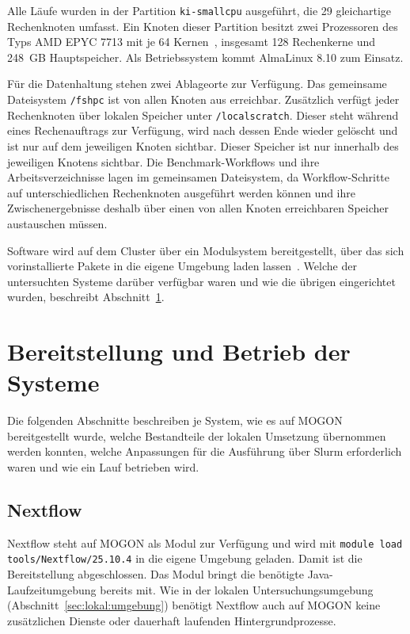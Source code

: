 Alle Läufe wurden in der Partition \texttt{ki-smallcpu} ausgeführt,
die 29 gleichartige Rechenknoten umfasst. Ein Knoten dieser
Partition besitzt zwei Prozessoren des Typs AMD EPYC 7713 mit je 64
Kernen~\cite{mogonnhr}, insgesamt 128 Rechenkerne und 248~GB
Hauptspeicher. Als Betriebssystem kommt AlmaLinux 8.10 zum Einsatz.

Für die Datenhaltung stehen zwei Ablageorte zur Verfügung. Das gemeinsame Dateisystem \texttt{/fshpc} ist von allen Knoten aus
erreichbar. Zusätzlich verfügt jeder Rechenknoten über lokalen Speicher unter
\texttt{/localscratch}. Dieser steht während eines Rechenauftrags
zur Verfügung, wird nach dessen Ende wieder gelöscht und ist nur
auf dem jeweiligen Knoten sichtbar. Dieser Speicher ist nur innerhalb des jeweiligen Knotens
sichtbar. Die Benchmark-Workflows und ihre Arbeitsverzeichnisse
lagen im gemeinsamen Dateisystem, da Workflow-Schritte auf
unterschiedlichen Rechenknoten ausgeführt werden können und ihre
Zwischenergebnisse deshalb über einen von allen Knoten
erreichbaren Speicher austauschen müssen.

Software wird auf dem Cluster über ein Modulsystem bereitgestellt,
über das sich vorinstallierte Pakete in die eigene Umgebung laden
lassen~\cite{mogondocs}. Welche der untersuchten Systeme darüber
verfügbar waren und wie die übrigen eingerichtet wurden, beschreibt
Abschnitt~\ref{sec:mogon:bereitstellung}.


\section{Bereitstellung und Betrieb der Systeme}
\label{sec:mogon:bereitstellung}

Die folgenden Abschnitte beschreiben je System, wie es auf MOGON
bereitgestellt wurde, welche Bestandteile der lokalen Umsetzung
übernommen werden konnten, welche Anpassungen für die Ausführung
über Slurm erforderlich waren und wie ein Lauf betrieben wird.
\subsection{Nextflow}
\label{sec:mogon:nextflow}

Nextflow steht auf MOGON als Modul zur Verfügung und wird mit
\texttt{module load tools/Nextflow/25.10.4} in die eigene Umgebung
geladen. Damit ist die Bereitstellung abgeschlossen. Das Modul
bringt die benötigte Java-Laufzeitumgebung bereits mit. Wie in der
lokalen Untersuchungsumgebung
(Abschnitt~\ref{sec:lokal:umgebung}) benötigt Nextflow auch auf
MOGON keine zusätzlichen Dienste oder dauerhaft laufenden
Hintergrundprozesse.

